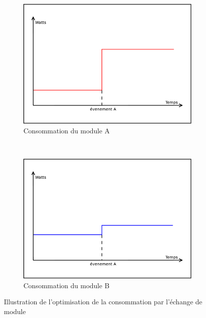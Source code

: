 \documentclass[a4paper, 11pt]{report}
\begin{document}
\begin{figure}
        \begin{subfigure}[b]{0.45\textwidth}
                \centering
                \includegraphics[width=\textwidth]{figures/Abstract_bundle_A}
                \caption{Consommation du module A}
                \label{AbsBdlA}
        \end{subfigure}
        ~
        \begin{subfigure}[b]{0.45\textwidth}
                \centering
                \includegraphics[width=\textwidth]{figures/Abstract_bundle_B}
                \caption{Consommation du module B}
                \label{AbsBdlB}
        \end{subfigure}
        \caption{Illustration de l’optimisation de la consommation par l’échange de module}
        \label{AbsBdl}
\end{figure}
\end{document}
